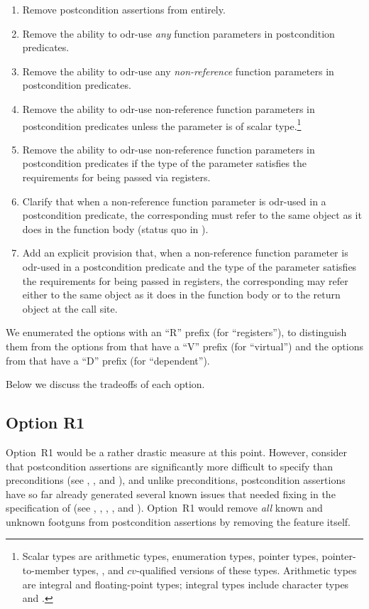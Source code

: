 \begin{enumerate}
\item Remove postcondition assertions from \cite{P2900R10} entirely.
\item Remove the ability to odr-use \emph{any} function parameters in postcondition predicates.
\item Remove the ability to odr-use any \emph{non-reference} function parameters in postcondition predicates.
\item Remove the ability to odr-use non-reference function parameters in postcondition predicates unless the parameter is of scalar type.\footnote{Scalar types are arithmetic types, enumeration types, pointer types, pointer-to-member types, , and $cv$-qualified versions of these types. Arithmetic types are integral and floating-point types; integral types include character types and .}
\item Remove the ability to odr-use non-reference function parameters in postcondition predicates if the type of the parameter satisfies the requirements for being passed via registers.
\item Clarify that when a non-reference function parameter is odr-used in a postcondition predicate, the corresponding  must refer to the same object as it does in the function body (status quo in \cite{P2900R10}).
\item Add an explicit provision that, when a non-reference function parameter is odr-used in a postcondition predicate and the type of the parameter satisfies the requirements for being passed in registers, the corresponding  may refer either to the same object as it does in the function body or to the return object at the call site.
\end{enumerate}

We enumerated the options with an ``R'' prefix (for ``registers''), to distinguish them from the options from \cite{D3484R1} that have a ``V'' prefix (for ``virtual'') and the options from \cite{D3489R0} that have a ``D'' prefix (for ``dependent'').

Below we discuss the tradeoffs of each option.

\subsection*{Option R1}

Option~R1 would be a rather drastic measure at this point. However, consider that postcondition assertions are significantly more difficult to specify than preconditions (see \cite{P1323R2}, \cite{P3007R0}, and \cite{P3098R0}), and unlike preconditions, postcondition assertions have so far already generated several known issues that needed fixing in the specification of \cite{P2900R10} (see \cite{P3387R0}, \cite{P3460R0}, \cite{P3483R0}, \cite{D3484R1}, and \cite{D3489R0}). Option~R1 would remove \emph{all} known and unknown footguns from postcondition assertions by removing the feature itself.

